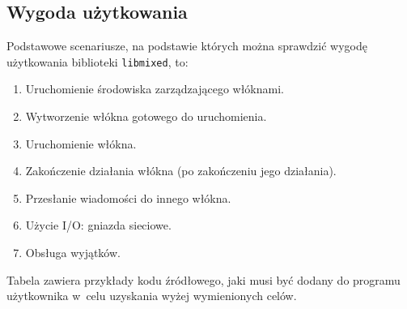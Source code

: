 \documentclass[12pt]{mwart}
\newcommand{\code}{\texttt}
\newcounter{tabmain}
\begin{document}
\subsection{Wygoda użytkowania}
\indent
  Podstawowe scenariusze, na podstawie których można sprawdzić wygodę użytkowania biblioteki \code{libmixed}, to:
  \begin{enumerate}
    \item Uruchomienie środowiska zarządzającego włóknami.
    \item Wytworzenie włókna gotowego do uruchomienia.
    \item Uruchomienie włókna.
    \item Zakończenie działania włókna (po zakończeniu jego działania).
    \item Przesłanie wiadomości do innego włókna.
    \item Użycie I/O: gniazda sieciowe.
    \item Obsługa wyjątków.
  \end{enumerate}
   \setcounter{mixedpthread}{\value{tabmain}}
\indent
  Tabela  zawiera przykłady kodu źródłowego, jaki musi być dodany do programu użytkownika w~celu uzyskania
  wyżej wymienionych celów.
\par
\end{document}

